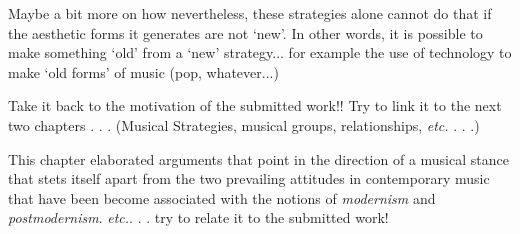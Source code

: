 Maybe a bit more on how nevertheless, these strategies alone cannot do that if the aesthetic forms it generates are not `new'. In other words, it is possible to make something `old' from a `new' strategy... for example the use of technology to make `old forms' of music (pop, whatever...)

Take it back to the motivation of the submitted work!! Try to link it to the next two chapters . . . (Musical Strategies, musical groups, relationships, \emph{etc.} . . .)

This chapter elaborated arguments that point in the direction of a musical stance that stets itself apart from the two prevailing attitudes in contemporary music that have been become associated with the notions of \emph{modernism} and \emph{postmodernism}. \emph{etc.}. . . try to relate it to the submitted work!

\label{ch:motivation}